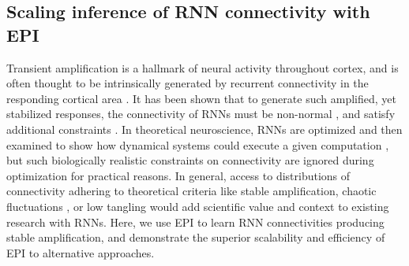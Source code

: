 \documentclass[11pt]{article}
\begin{document}
\subsection{Scaling inference of RNN connectivity with EPI} \label{results_LRRNN}
Transient amplification is a hallmark of neural activity throughout cortex, and is often thought to be intrinsically generated by recurrent connectivity in the responding cortical area \cite{murphy2009balanced, hennequin2014optimal, bondanelli2019population}.
It has been shown that to generate such amplified, yet stabilized responses, the connectivity of RNNs must be non-normal \cite{goldman2009memory, murphy2009balanced}, and satisfy additional constraints \cite{bondanelli2020coding}.
In theoretical neuroscience, RNNs are optimized and then examined to show how dynamical systems could execute a given computation \cite{sussillo2014neural, barak2017recurrent}, but such biologically realistic constraints on connectivity are  ignored during optimization for practical reasons.
In general, access to distributions of connectivity adhering to theoretical criteria like stable amplification, chaotic fluctuations \cite{sompolinsky1988chaos}, or low tangling \cite{russo2018motor} would add scientific value and context to existing research with RNNs.
Here, we use EPI to learn RNN connectivities producing stable amplification, and demonstrate the superior scalability and efficiency of EPI to alternative approaches.
\end{document}
